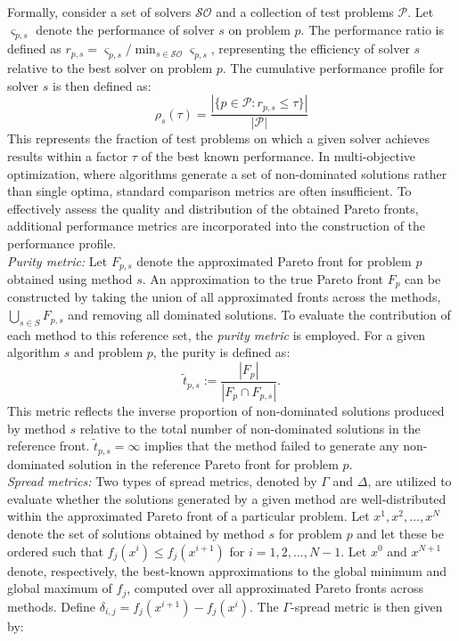 \documentclass[amsa]{ipart}
\theoremstyle{plain}
\numberwithin{equation}{section}
\begin{document}
Formally, consider a set of solvers $\mathcal{SO}$ and a collection of test problems $\mathcal{P}$. Let $\varsigma_{p,s}$ denote the performance of solver $s$ on problem $p$. The performance ratio is defined as $r_{p,s} = \varsigma_{p,s} / \min_{s \in \mathcal{SO}} \varsigma_{p,s}$, representing the efficiency of solver $s$ relative to the best solver on problem $p$. The cumulative performance profile for solver $s$ is then defined as:
\begin{equation*}
 \rho_s(\tau) = \frac{|\{p \in \mathcal{P} : r_{p,s} \leq \tau\}|}{|\mathcal{P}|}
\end{equation*}
This represents the fraction of test problems on which a given solver achieves results within a factor $\tau$ of the best known performance. In multi-objective optimization, where algorithms generate a set of non-dominated solutions rather than single optima, standard comparison metrics are often insufficient. To effectively assess the quality and distribution of the obtained Pareto fronts, additional performance metrics are incorporated into the construction of the performance profile.\\
\textit{Purity metric:} Let $F_{p,s}$ denote the approximated Pareto front for problem $p$ obtained using method $s$. An approximation to the true Pareto front $F_p$ can be constructed by taking the union of all approximated fronts across the methods, $\bigcup_{s \in S} F_{p,s}$ and removing all dominated solutions. To evaluate the contribution of each method to this reference set, the \textit{purity metric} is employed. For a given algorithm $s$ and problem $p$, the purity is defined as:
\begin{equation*}
\tilde{t}_{p,s} := \frac{|F_{p}|}{|F_p \cap F_{p,s}|}.
\end{equation*}
This metric reflects the inverse proportion of non-dominated solutions produced by method $s$ relative to the total number of non-dominated solutions in the reference front. $\tilde{t}_{p,s} = \infty$ implies that the method failed to generate any non-dominated solution in the reference Pareto front for problem $p$.\\
\textit{Spread metrics:} Two types of spread metrics, denoted by $\Gamma$ and $\Delta$, are utilized to evaluate whether the solutions generated by a given method are well-distributed within the approximated Pareto front of a particular problem. Let $x^1, x^2, \ldots, x^N$ denote the set of solutions obtained by method $s$ for problem $p$ and let these be ordered such that $f_j(x^i) \leq f_j(x^{i+1})$ for $i = 1, 2, \ldots, N - 1$. Let $x^0$ and $x^{N+1}$ denote, respectively, the best-known approximations to the global minimum and global maximum of $f_j$, computed over all approximated Pareto fronts across methods. Define $\delta_{i,j} = f_j(x^{i+1}) - f_j(x^i)$. The $\Gamma$-spread metric is then given by:
\end{document}
